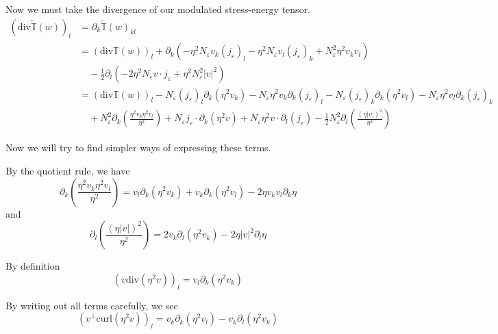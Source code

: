 \documentclass[a4paper]{article}
\newcommand{\curl}{\mathrm{curl}}
\renewcommand{\div}{\mathrm{div}}
\begin{document}
Now we must take the divergence of our modulated stress-energy tensor.
\begin{align}
  ( \div \tilde{\mathbb{T}}(w) )_l &= \partial_k \tilde{\mathbb{T}}(w)_{kl} \nonumber \\
  &= ( \div \mathbb{T}(w) )_l + \partial_k \left( - \eta^2 N_\varepsilon v_k (j_\varepsilon)_l - \eta^2 N_\varepsilon v_l (j_\varepsilon)_k +
  N_\varepsilon^2 \eta^2 v_k v_l \right) \nonumber \\
  &\quad - \frac{1}{2} \partial_l ( -2 \eta^2 N_\varepsilon v \cdot j_\varepsilon + \eta^2 N_\varepsilon^2 |v|^2 ) \nonumber \\
  &= (\div \mathbb{T}(w))_l - N_\varepsilon (j_\varepsilon)_l \partial_k (\eta^2 v_k) - N_\varepsilon \eta^2 v_k \partial_k ( j_\varepsilon )_l -
  N_\varepsilon (j_\varepsilon)_k \partial_k (\eta^2 v_l) - N_\varepsilon \eta^2 v_l \partial_k (j_\varepsilon)_k \nonumber \\
  &\quad + N_\varepsilon^2 \partial_k \left( \frac{\eta^2 v_k \eta^2 v_l}{\eta^2} \right) + N_\varepsilon j_\varepsilon \cdot \partial_k (\eta^2 v) +
  N_\varepsilon \eta^2 v \cdot \partial_l (j_\varepsilon) - \frac{1}{2} N_\varepsilon^2 \partial_l \left( \frac{(\eta |v|)^2}{\eta^2} \right)
  \label{eqn:div_mod_stress_energy1}
\end{align}

Now we will try to find simpler ways of expressing these terms.

By the quotient rule, we have
\begin{equation}
  \partial_k \left( \frac{\eta^2 v_k \eta^2 v_l}{\eta^2} \right) = v_l \partial_k (\eta^2 v_k) + v_k \partial_k(\eta^2 v_l) - 2 \eta v_k v_l
  \partial_k \eta
  \label{eqn:quot_rule1}
\end{equation}
and
\begin{equation}
  \partial_l \left( \frac{(\eta |v|)^2}{\eta^2} \right) = 2 v_k \partial_l (\eta^2 v_k) - 2 \eta |v|^2 \partial_l \eta
  \label{eqn:quot_rule2}
\end{equation}

By definition
\begin{equation}
  (v \div( \eta^2 v ))_l = v_l \partial_k (\eta^2 v_k)
  \label{eqn:v_div_eta^2v}
\end{equation}

By writing out all terms carefully, we see
\begin{equation}
  (v^\perp \curl (\eta^2 v) )_l = v_k \partial_k(\eta^2 v_l) - v_k \partial_l ( \eta^2 v_k )
  \label{eqn:v_curl_eta^2v}
\end{equation}
\end{document}
